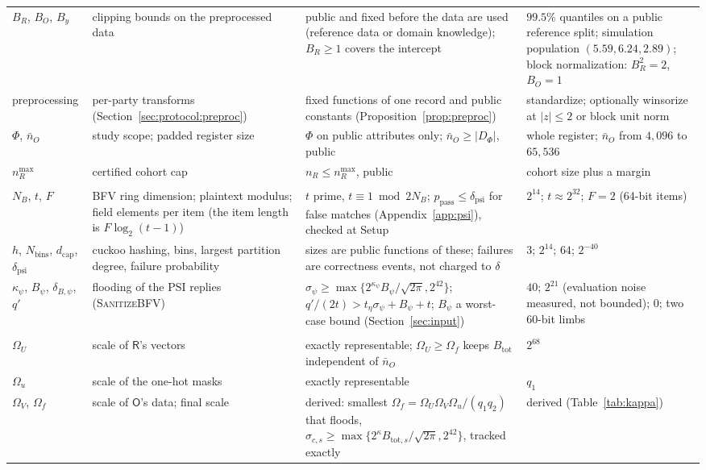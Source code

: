 \documentclass[11pt]{article}
\theoremstyle{definition}
\theoremstyle{plain}
\newcommand{\Party}[1]{\textsf{#1}}
\newcommand{\Rp}{\Party{R}}
\newcommand{\Op}{\Party{O}}
\begin{document}
{\begin{xltabular}{\textwidth}{@{}>{\raggedright\arraybackslash}p{2.35cm}>{\raggedright\arraybackslash}X>{\raggedright\arraybackslash}X>{\raggedright\arraybackslash}p{3.0cm}@{}}
$B_R$, $B_O$, $B_y$ & clipping bounds on the preprocessed data & public and fixed before the data are used (reference data or domain knowledge); $B_R \ge 1$ covers the intercept & $99.5\%$ quantiles on a public reference split; simulation population $(5.59, 6.24, 2.89)$; block normalization: $B_R^2 = 2$, $B_O = 1$ \\
preprocessing & per-party transforms (Section~\ref{sec:protocol:preproc}) & fixed functions of one record and public constants (Proposition~\ref{prop:preproc}) & standardize; optionally winsorize at $|z| \le 2$ or block unit norm \\
$\Phi$, $\bar n_O$ & study scope; padded register size & $\Phi$ on public attributes only; $\bar n_O \ge |D_\Phi|$, public & whole register; $\bar n_O$ from $4{,}096$ to $65{,}536$ \\
$n_R^{\max}$ & certified cohort cap & $n_R \le n_R^{\max}$, public & cohort size plus a margin \\
\midrule
{} \\*
$N_B$, $t$, $F$ & BFV ring dimension; plaintext modulus; field elements per item (the item length is $F\log_2(t-1)$) & $t$ prime, $t \equiv 1 \bmod 2N_B$; $p_{\mathrm{pass}} \le \delta_{\mathrm{psi}}$ for false matches (Appendix~\ref{app:psi}), checked at Setup & $2^{14}$; $t \approx 2^{32}$; $F = 2$ (64-bit items) \\
$h$, $N_{\mathrm{bins}}$, $d_{\mathrm{cap}}$, $\delta_{\mathrm{psi}}$ & cuckoo hashing, bins, largest partition degree, failure probability & sizes are public functions of these; failures are correctness events, not charged to $\delta$ & $3$; $2^{14}$; $64$; $2^{-40}$ \\
$\kappa_\psi$, $B_\psi$, $\delta_{B,\psi}$, $q'$ & flooding of the PSI replies (\textsc{SanitizeBFV}) & $\sigma_\psi \ge \max\{2^{\kappa_\psi}B_\psi/\sqrt{2\pi}, 2^{42}\}$; $q'/(2t) > t_\eta\sigma_\psi + B_\psi + t$; $B_\psi$ a worst-case bound (Section~\ref{sec:input}) & $40$; $2^{21}$ (evaluation noise measured, not bounded); $0$; two 60-bit limbs \\
\midrule
{} \\*
$\Omega_U$ & scale of $\Rp$'s vectors & exactly representable; $\Omega_U \ge \Omega_f$ keeps $B_{\mathrm{tot}}$ independent of $\bar n_O$ & $2^{68}$ \\
$\Omega_u$ & scale of the one-hot masks & exactly representable & $q_1$ \\
$\Omega_V$, $\Omega_f$ & scale of $\Op$'s data; final scale & derived: smallest $\Omega_f = \Omega_U\Omega_V\Omega_u/(q_1q_2)$ that floods, $\sigma_{c,s} \ge \max\{2^{\kappa}B_{\mathrm{tot},s}/\sqrt{2\pi}, 2^{42}\}$, tracked exactly & derived (Table~\ref{tab:kappa}) \\
\end{xltabular}}
\end{document}
